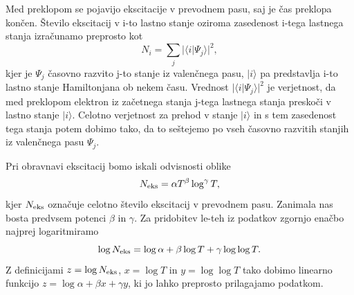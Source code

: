 Med preklopom se pojavijo ekscitacije v prevodnem pasu, saj je čas preklopa končen.
Število ekscitacij v i-to lastno stanje oziroma zasedenost i-tega lastnega stanja izračunamo preprosto kot
\begin{equation}
N_i = \sum_j |\langle i | \Psi_j \rangle|^2,
\end{equation}
kjer je $\Psi_j$ časovno razvito j-to stanje iz valenčnega pasu, $| i \rangle$ pa predstavlja i-to lastno stanje Hamiltonjana ob nekem času. Vrednost $| \langle i | \Psi_j \rangle |^2$ je verjetnost, da med preklopom elektron iz začetnega stanja j-tega lastnega stanja preskoči v lastno stanje $| i \rangle$. Celotno verjetnost za prehod v stanje $| i \rangle$ in s tem zasedenost tega stanja potem dobimo tako, da to seštejemo po vseh časovno razvitih stanjih iz valenčnega pasu $\Psi_j$.

Pri obravnavi ekscitacij bomo iskali odvisnosti oblike 
\begin{equation}
N_{\textup{eks}} = \alpha T^{\beta} \log^\gamma T,
\end{equation}
kjer $N_{\textup{eks}}$ označuje celotno število ekscitacij v prevodnem pasu. Zanimala nas bosta predvsem potenci $\beta$ in $\gamma$. Za pridobitev le-teh iz podatkov zgornjo enačbo najprej logaritmiramo
\begin{equation}
\log N_{\textup{eks}} = \log \alpha + \beta \log T + \gamma \log \log T.
\end{equation}
Z definicijami $z=\log N_{\textup{eks}}$, $x=\log T$ in $y=\log \log T$ tako dobimo linearno funkcijo $z=\log \alpha + \beta x + \gamma y$, ki jo lahko preprosto prilagajamo podatkom.

